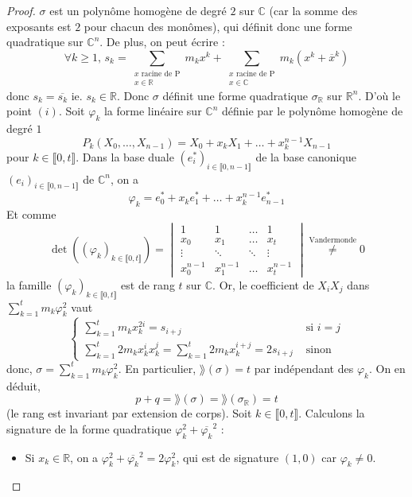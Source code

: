 	\begin{proof}
		$\sigma$ est un polynôme homogène de degré $2$ sur $\mathbb{C}$ (car la somme des exposants est $2$ pour chacun des monômes), qui définit donc une forme quadratique sur $\mathbb{C}^n$. De plus, on peut écrire :
		\[ \forall k \geq 1, \, s_k = \sum_{\substack{x \text{ racine de P} \\ x \in \mathbb{R}}} m_k x^k + \sum_{\substack{x \text{ racine de P} \\ x \in \mathbb{C}}} m_k (x^k + \overline{x}^k) \]
		donc $s_k = \overline{s_k}$ ie. $s_k \in \mathbb{R}$. Donc $\sigma$ définit une forme quadratique $\sigma_{\mathbb{R}}$ sur $\mathbb{R}^n$. D'où le point $(i)$.
		\newpar
		Soit $\varphi_k$ la forme linéaire sur $\mathbb{C}^n$ définie par le polynôme homogène de degré $1$
		\[ P_k(X_0, \dots, X_{n-1}) = X_0 + x_k X_1 + \dots + x_k^{n-1} X_{n-1} \]
		pour $k \in \llbracket 0, t \rrbracket$. Dans la base duale $(e_i^*)_{i \in \llbracket 0, n-1 \rrbracket}$ de la base canonique $(e_i)_{i \in \llbracket 0, n-1 \rrbracket}$ de $\mathbb{C}^n$, on a
		\[ \varphi_k = e_0^* + x_k e_1^* + \dots + x_k^{n-1} e_{n-1}^* \]
		Et comme
		\[ \det((\varphi_k)_{k \in \llbracket 0, t \rrbracket}) = \begin{vmatrix} 1 & 1 & \dots & 1 \\ x_0 & x_1 & \dots & x_t \\ \vdots & \ddots & \ddots & \vdots \\ x_0^{n-1} & x_1^{n-1} & \dots & x_t^{n-1} \end{vmatrix} \overset{\text{Vandermonde}}{\neq} 0 \]
		la famille $(\varphi_k)_{k \in \llbracket 0, t \rrbracket}$ est de rang $t$ sur $\mathbb{C}$. Or, le coefficient de $X_i X_j$ dans $\sum_{k=1}^t m_k \varphi_k^2$ vaut
		\[ \begin{cases} \sum_{k=1}^t m_k x_k^{2i} = s_{i+j} &\text{ si } i=j \\ \sum_{k=1}^t 2 m_k x_k^i x_k^j = \sum_{k=1}^t 2 m_k x_k^{i+j} = 2s_{i+j} &\text{ sinon} \end{cases} \]
		donc, $\sigma = \sum_{k=1}^t m_k \varphi_k^2$. En particulier, $\rang (\sigma) = t$ par indépendant des $\varphi_k$. On en déduit,
		\[ p+q = \rang(\sigma) = \rang(\sigma_{\mathbb{R}}) = t \]
		(le rang est invariant par extension de corps).
		\newpar
		Soit $k \in \llbracket 0, t \rrbracket$. Calculons la signature de la forme quadratique $\varphi_k^2 + \overline{\varphi_k}^2$ :
		\begin{itemize}
			\item Si $x_k \in \mathbb{R}$, on a $\varphi_k^2 + \overline{\varphi_k}^2 = 2 \varphi_k^2$, qui est de signature $(1, 0)$ car $\varphi_k \neq 0$.

\end{itemize}
\end{proof}
